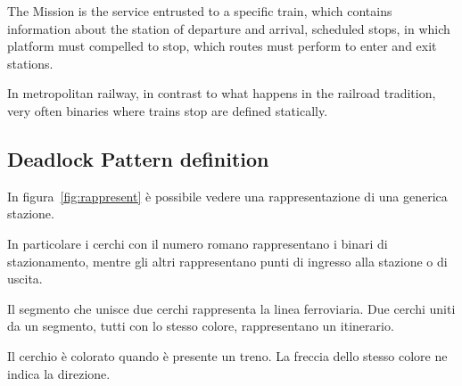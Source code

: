 \documentclass{ewic}
\begin{document}
The Mission is the service entrusted to a specific train, which contains information about the station of departure and arrival, scheduled stops, in which platform must compelled to stop, which routes must perform to enter and exit stations.
 


In metropolitan railway, in contrast to what happens in the railroad tradition, very often binaries where trains stop are defined statically.
 



 



\subsection{Deadlock Pattern definition}

In figura~\ref{fig:rappresent} è possibile vedere una rappresentazione di una generica stazione. 

In particolare i cerchi con il numero romano rappresentano i binari di stazionamento, mentre gli altri rappresentano punti di ingresso alla stazione o di uscita.

 Il segmento che unisce due cerchi rappresenta la linea ferroviaria. 
 Due cerchi uniti da un segmento, tutti con lo stesso colore, rappresentano un itinerario. 
 
 Il cerchio è colorato quando è presente un treno. La freccia dello stesso colore ne indica la direzione.
\end{document}
